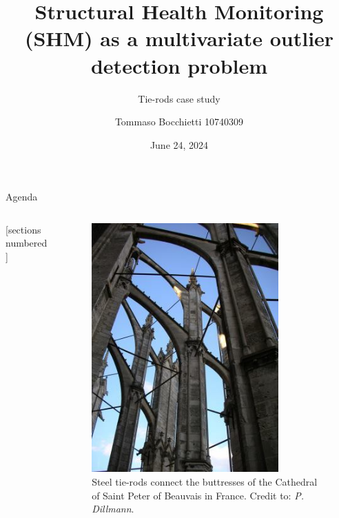 \documentclass[9pt]{beamer}
\title{Structural Health Monitoring (SHM) as a multivariate outlier detection problem}
\subtitle{Tie-rods case study}
\date{June 24, 2024}
\author{Tommaso Bocchietti 10740309}
\institute{Politecnico di Milano}
\begin{document}
\maketitle

\begin{frame}{Agenda}

    \begin{columns}[c, onlytextwidth]

        \begin{column}{0.5\textwidth}

            [sections numbered]
            \tableofcontents

        \end{column}

        \begin{column}{0.5\textwidth}

            \begin{figure}[H]
                \centering
                \includegraphics[width=0.8\textwidth]{img/tie-rods-cathedral.jpeg}
                \caption{Steel tie-rods connect the buttresses of the Cathedral of Saint Peter of Beauvais in France. Credit to: \textit{P. Dillmann}.}
            \end{figure}

        \end{column}

    \end{columns}

\end{frame}
\end{document}
